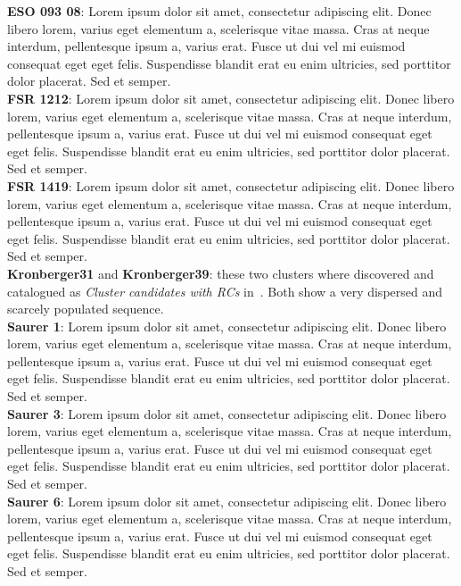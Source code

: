 \documentclass{aa}
\begin{document}
 \noindent\textbf{ESO 093 08}: Lorem ipsum dolor sit amet, consectetur adipiscing elit. Donec libero lorem, varius eget elementum a, scelerisque vitae massa. Cras at neque interdum, pellentesque ipsum a, varius erat. Fusce ut dui vel mi euismod consequat eget eget felis. Suspendisse blandit erat eu enim ultricies, sed porttitor dolor placerat. Sed et semper.\\

 \noindent\textbf{FSR 1212}: Lorem ipsum dolor sit amet, consectetur adipiscing elit. Donec libero lorem, varius eget elementum a, scelerisque vitae massa. Cras at neque interdum, pellentesque ipsum a, varius erat. Fusce ut dui vel mi euismod consequat eget eget felis. Suspendisse blandit erat eu enim ultricies, sed porttitor dolor placerat. Sed et semper.\\

 \noindent\textbf{FSR 1419}: Lorem ipsum dolor sit amet, consectetur adipiscing elit. Donec libero lorem, varius eget elementum a, scelerisque vitae massa. Cras at neque interdum, pellentesque ipsum a, varius erat. Fusce ut dui vel mi euismod consequat eget eget felis. Suspendisse blandit erat eu enim ultricies, sed porttitor dolor placerat. Sed et semper.\\

 \noindent\textbf{Kronberger31} and \textbf{Kronberger39}: these two clusters
 where discovered and catalogued as \emph{Cluster candidates with RCs}
 in~\cite{Kronberger_2006}. Both show a very dispersed and scarcely populated
 sequence.\\

 \noindent\textbf{Saurer 1}: Lorem ipsum dolor sit amet, consectetur adipiscing elit. Donec libero lorem, varius eget elementum a, scelerisque vitae massa. Cras at neque interdum, pellentesque ipsum a, varius erat. Fusce ut dui vel mi euismod consequat eget eget felis. Suspendisse blandit erat eu enim ultricies, sed porttitor dolor placerat. Sed et semper.\\

 \noindent\textbf{Saurer 3}: Lorem ipsum dolor sit amet, consectetur adipiscing elit. Donec libero lorem, varius eget elementum a, scelerisque vitae massa. Cras at neque interdum, pellentesque ipsum a, varius erat. Fusce ut dui vel mi euismod consequat eget eget felis. Suspendisse blandit erat eu enim ultricies, sed porttitor dolor placerat. Sed et semper.\\

 \noindent\textbf{Saurer 6}: Lorem ipsum dolor sit amet, consectetur adipiscing elit. Donec libero lorem, varius eget elementum a, scelerisque vitae massa. Cras at neque interdum, pellentesque ipsum a, varius erat. Fusce ut dui vel mi euismod consequat eget eget felis. Suspendisse blandit erat eu enim ultricies, sed porttitor dolor placerat. Sed et semper.\\
\end{document}
